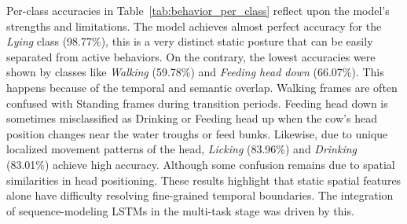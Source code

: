 Per-class accuracies in Table~\ref{tab:behavior_per_class} reflect upon the model's strengths and limitations. The model achieves almost perfect accuracy for the \textit{Lying} class (98.77\%), this is a very distinct static posture that can be easily separated from active behaviors. On the contrary, the lowest accuracies were shown by classes like \textit{Walking} (59.78\%) and \textit{Feeding head down} (66.07\%). This happens because of the temporal and semantic overlap. Walking frames are often confused with Standing frames during transition periods. Feeding head down is sometimes misclassified as Drinking or Feeding head up when the cow's head position changes near the water troughs or feed bunks. Likewise, due to unique localized movement patterns of the head, \textit{Licking} (83.96\%) and \textit{Drinking} (83.01\%) achieve high accuracy. Although some confusion remains due to spatial similarities in head positioning. These results highlight that static spatial features alone have difficulty resolving fine-grained temporal boundaries. The integration of sequence-modeling LSTMs in the multi-task stage was driven by this.


